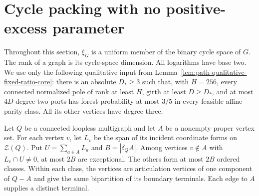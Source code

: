 \section{Cycle packing with no positive-excess parameter}
\label{sec:four-unrestricted-iterative-packing}

Throughout this section, $\xi_G$ is a uniform member of the binary cycle space of $G$.
The rank of a graph is its cycle-space dimension.
All logarithms have base two.
We use only the following qualitative input from
Lemma~\ref{lem:path-qualitative-fixed-ratio-core}:
there is an absolute $D_*\ge3$ such that, with $H=256$, every connected normalized pole of rank at least $H$, girth at least $D\ge D_*$, and at most $4D$ degree-two ports has forest probability at most $3/5$ in every feasible affine parity class.
All its other vertices have degree three.

\begin{lemma}
\label{lem:four-terminal-bipartition}
Let $Q$ be a connected loopless multigraph and let $A$ be a nonempty proper vertex set.
For each vertex $v$, let $L_v$ be the span of its incident coordinate forms on $\mathcal Z(Q)$.
Put $U=\sum_{a\in A}L_a$ and $B=|\delta_QA|$.
Among vertices $v\notin A$ with $L_v\cap U\ne0$, at most $2B$ are exceptional.
The others form at most $2B$ ordered classes.
Within each class, the vertices are articulation vertices of one component of $Q-A$ and give the same bipartition of its boundary terminals.
Each edge to $A$ supplies a distinct terminal.
\end{lemma}

